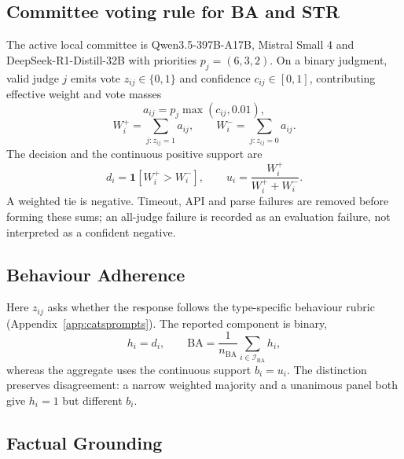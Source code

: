 \subsection{Committee voting rule for BA and STR}

The active local committee is Qwen3.5-397B-A17B, Mistral Small 4 and
DeepSeek-R1-Distill-32B with priorities $p_j=(6,3,2)$. On a binary judgment,
valid judge $j$ emits vote $z_{ij}\in\{0,1\}$ and confidence $c_{ij}\in[0,1]$,
contributing effective weight and vote masses
\[
a_{ij}=p_j\max(c_{ij},0.01),
\]
\[
W_i^{+}=\!\!\sum_{j:z_{ij}=1}\!\!a_{ij},\qquad
W_i^{-}=\!\!\sum_{j:z_{ij}=0}\!\!a_{ij}.
\]
The decision and the continuous positive support are
\[
d_i=\mathbf{1}[W_i^{+}>W_i^{-}],\qquad
u_i=\frac{W_i^{+}}{W_i^{+}+W_i^{-}}.
\]
A weighted tie is negative. Timeout, API and parse failures are removed before
forming these sums; an all-judge failure is recorded as an evaluation failure,
not interpreted as a confident negative.

\subsection{Behaviour Adherence}

Here $z_{ij}$ asks whether the response follows the type-specific behaviour
rubric (Appendix~\ref{app:catsprompts}). The reported component is binary,
\[
h_i=d_i,\qquad
\mathrm{BA}=\frac{1}{n_{\mathrm{BA}}}\sum_{i\in\mathcal{I}_{\mathrm{BA}}}h_i,
\]
whereas the aggregate uses the continuous support $b_i=u_i$. The distinction
preserves disagreement: a narrow weighted majority and a unanimous panel both
give $h_i=1$ but different $b_i$.

\subsection{Factual Grounding}

